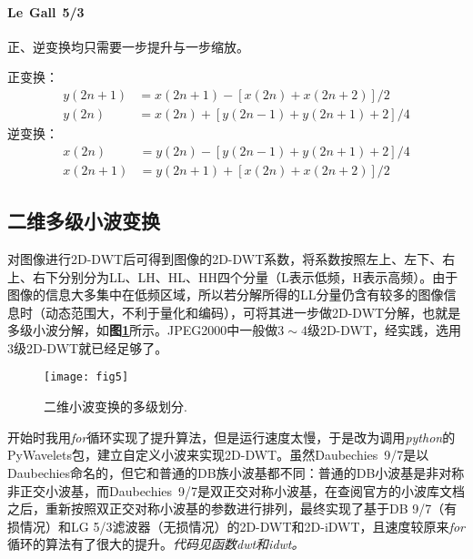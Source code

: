 \paragraph{Le Gall 5/3} 正、逆变换均只需要一步提升与一步缩放。\par
正变换：
\[
\begin{aligned}
y(2n+1)&=x(2n+1)-[x(2n)+x(2n+2)]/2\\
y(2n)&=x(2n)+[y(2n-1)+y(2n+1)+2]/4
\end{aligned}
\]
逆变换：
\[
\begin{aligned}
x(2n)&=y(2n)-[y(2n-1)+y(2n+1)+2]/4\\
x(2n+1)&=y(2n+1)+[x(2n)+x(2n+2)]/2
\end{aligned}
\]

\subsection{二维多级小波变换}
对图像进行2D-DWT后可得到图像的2D-DWT系数，将系数按照左上、左下、右上、右下分别分为LL、LH、HL、HH四个分量（L表示低频，H表示高频）。由于图像的信息大多集中在低频区域，所以若分解所得的LL分量仍含有较多的图像信息时（动态范围大，不利于量化和编码），可将其进一步做2D-DWT分解，也就是多级小波分解，如\textbf{图\ref{fig5}}所示。JPEG2000中一般做$3\sim 4$级2D-DWT，经实践，选用3级2D-DWT就已经足够了。

\begin{figure}[H]
	\centering
	\texttt{[image: fig5]}
	\caption{二维小波变换的多级划分.}
	\label{fig5}
\end{figure}
开始时我用\textit{for}循环实现了提升算法，但是运行速度太慢，于是改为调用\textit{python}的PyWavelets包，建立自定义小波来实现2D-DWT。虽然Daubechies 9/7是以Daubechies命名的，但它和普通的DB族小波基都不同：普通的DB小波基是非对称非正交小波基，而Daubechies 9/7是双正交对称小波基，在查阅官方的小波库文档之后，重新按照双正交对称小波基的参数进行排列，最终实现了基于DB 9/7（有损情况）和LG 5/3滤波器（无损情况）的2D-DWT和2D-iDWT，且速度较原来\textit{for}循环的算法有了很大的提升。\textit{代码见函数dwt和idwt。}



